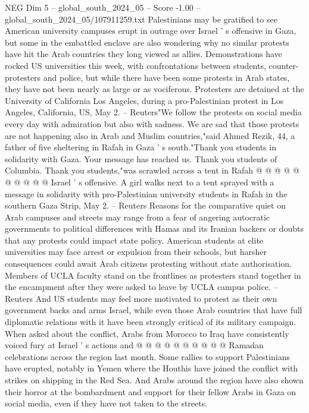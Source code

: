 \begin{textsample}{NEG Dim 5 – global\_south\_2024\_05 – Score -1.00 – global\_south\_2024\_05/107911259.txt}  \label{ex:f5_neg_321}
Palestinians may be gratified to see American university campuses erupt in outrage over Israel ' s offensive in Gaza, but some in the embattled enclave are also wondering why no similar protests have hit the Arab countries they long viewed as allies.
Demonstrations have rocked US universities this week, with confrontations between students, counter-protesters and police, but while there have been some protests in Arab states, they have not been nearly as large or as vociferous.
Protesters are detained at the University of California Los Angeles, during a pro-Palestinian protest in Los Angeles, California, US, May 2. -- Reuters"We follow the protests on social media every day with admiration but also with sadness.
We are sad that those protests are not happening also in Arab and Muslim countries,"said Ahmed Rezik, 44, a father of five sheltering in Rafah in Gaza ' s south."Thank you students in solidarity with Gaza.
Your message has reached us.
Thank you students of Columbia.
Thank you students,"was scrawled across a tent in Rafah @ @ @ @ @ @ @ @ @ @ Israel ' s offensive.
A girl walks next to a tent sprayed with a message in solidarity with pro-Palestinian university students in Rafah in the southern Gaza Strip, May 2. -- Reuters Reasons for the comparative quiet on Arab campuses and streets may range from a fear of angering autocratic governments to political differences with Hamas and its Iranian backers or doubts that any protests could impact state policy.
American students at elite universities may face arrest or expulsion from their schools, but harsher consequences could await Arab citizens protesting without state authorisation.
Members of UCLA faculty stand on the frontlines as protesters stand together in the encampment after they were asked to leave by UCLA campus police. -- Reuters And US students may feel more motivated to protest as their own government backs and arms Israel, while even those Arab countries that have full diplomatic relations with it have been strongly critical of its military campaign.
When asked about the conflict, Arabs from Morocco to Iraq have consistently voiced fury at Israel ' s actions and @ @ @ @ @ @ @ @ @ @ Ramadan celebrations across the region last month.
Some rallies to support Palestinians have erupted, notably in Yemen where the Houthis have joined the conflict with strikes on shipping in the Red Sea.
And Arabs around the region have also shown their horror at the bombardment and support for their fellow Arabs in Gaza on social media, even if they have not taken to the streets.

\end{textsample}

